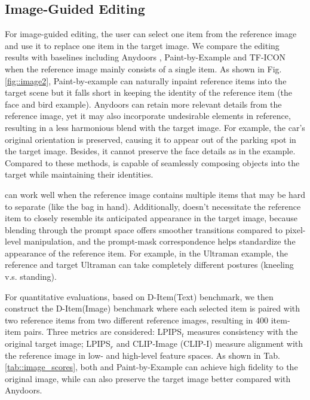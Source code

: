 \subsection{Image-Guided Editing}



For image-guided editing, the user can select one item from the reference image and use it to replace one item in the target image.
We compare the editing results with baselines including Anydoors \cite{chen2023anydoor}, Paint-by-Example \cite{yang2023paint} and TF-ICON \cite{lu2023tf} when the reference image mainly consists of a single item.
As shown in Fig. \ref{fig::image2},
Paint-by-example can naturally inpaint reference items into the target scene but it falls short in keeping the identity of the reference item (the face and bird example).
Anydoors can retain more relevant details from the reference image, yet it may also incorporate undesirable elements in reference, resulting in a less harmonious blend with the target image.
For example, the car's original orientation is preserved, causing it to appear out of the parking spot in the target image.
Besides, it cannot preserve the face details as in the example.
Compared to these methods, 
\dedit{} is capable of seamlessly composing objects into the target while maintaining their identities.


\dedit{} can work well when the reference image contains multiple items that may be hard to separate (like the bag in hand).
Additionally, \dedit{} doesn't necessitate the reference item to closely resemble its anticipated appearance in the target image, because blending through the prompt space offers smoother transitions compared to pixel-level manipulation, and the prompt-mask correspondence helps standardize the appearance of the reference item.
For example, in the Ultraman example, the reference and target Ultraman can take completely different postures (kneeling v.s. standing).

For quantitative evaluations, based on D-Item(Text) benchmark, we then construct the D-Item(Image) benchmark where each selected item is paired with two reference items from two different reference images, resulting in 400 item-item pairs.
Three metrics are considered: LPIPS$_t$ measures consistency with the original target image; LPIPS$_r$ and CLIP-Image (CLIP-I) measure alignment with the reference image in low- and high-level feature spaces.
As shown in Tab. \ref{tab::image_scores}, both \dedit{} and Paint-by-Example can achieve high fidelity to the original image, while \dedit{} can also preserve the target image better compared with Anydoors.


